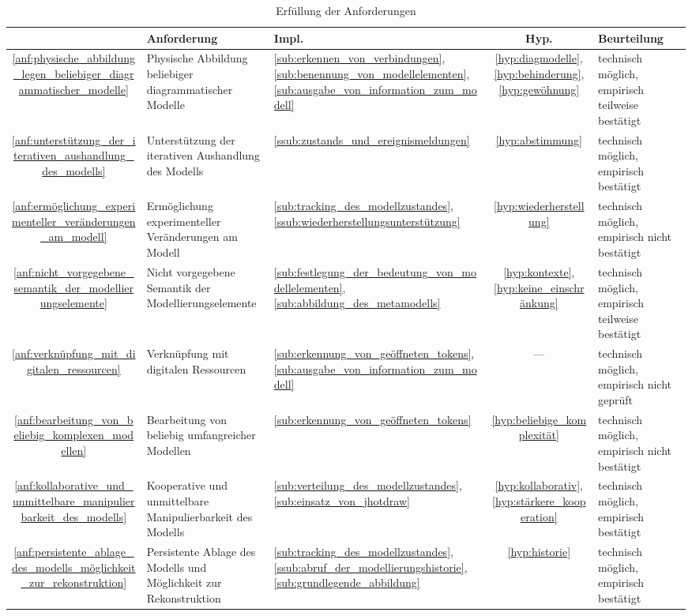 \begin{table}[htbp]
	\centering
	\caption{Erfüllung der Anforderungen}
\begin{tabular}{| c | p{5cm} | p{1cm} | c | p{4cm} |} 
  \hline
  & Anforderung & Impl. & Hyp. & Beurteilung \\ \hline \hline
  \ref{anf:physische_abbildung_legen_beliebiger_diagrammatischer_modelle} & Physische Abbildung beliebiger diagrammatischer Modelle &  \ref{sub:erkennen_von_verbindungen}, \ref{sub:benennung_von_modellelementen}, \ref{sub:ausgabe_von_information_zum_modell} & \ref{hyp:diagmodelle}, \ref{hyp:behinderung}, \ref{hyp:gewöhnung} & technisch möglich, empirisch teilweise bestätigt \\ \hline
  \ref{anf:unterstützung_der_iterativen_aushandlung_des_modells} & Unterstützung der iterativen Aushandlung des Modells & \ref{ssub:zustands_und_ereignismeldungen} & \ref{hyp:abstimmung} & technisch möglich, empirisch bestätigt \\ \hline
  \ref{anf:ermöglichung_experimenteller_veränderungen_am_modell} & Ermöglichung experimenteller Veränderungen am Modell & \ref{sub:tracking_des_modellzustandes}, \ref{ssub:wiederherstellungsunterstützung} & \ref{hyp:wiederherstellung} & technisch möglich, empirisch nicht bestätigt \\ \hline \hline
  \ref{anf:nicht_vorgegebene_semantik_der_modellierungselemente} & Nicht vorgegebene Semantik der Modellierungselemente & \ref{sub:festlegung_der_bedeutung_von_modellelementen}, \ref{sub:abbildung_des_metamodells} & \ref{hyp:kontexte}, \ref{hyp:keine_einschränkung} & technisch möglich, empirisch teilweise bestätigt \\ \hline
  \ref{anf:verknüpfung_mit_digitalen_ressourcen} & Verknüpfung mit digitalen Ressourcen & \ref{sub:erkennung_von_geöffneten_tokens}, \ref{sub:ausgabe_von_information_zum_modell} & --- & technisch möglich, empirisch nicht geprüft \\ \hline
  \ref{anf:bearbeitung_von_beliebig_komplexen_modellen} & Bearbeitung von beliebig umfangreicher Modellen & \ref{sub:erkennung_von_geöffneten_tokens} & \ref{hyp:beliebige_komplexität} & technisch möglich, empirisch nicht bestätigt \\ \hline \hline
  \ref{anf:kollaborative_und_unmittelbare_manipulierbarkeit_des_modells} & Kooperative und unmittelbare Manipulierbarkeit des Modells & \ref{sub:verteilung_des_modellzustandes}, \ref{sub:einsatz_von_jhotdraw} & \ref{hyp:kollaborativ}, \ref{hyp:stärkere_kooperation} & technisch möglich, empirisch bestätigt \\ \hline
  \ref{anf:persistente_ablage_des_modells_möglichkeit_zur_rekonstruktion} & Persistente Ablage des Modells und Möglichkeit zur Rekonstruktion & \ref{sub:tracking_des_modellzustandes}, \ref{ssub:abruf_der_modellierungshistorie}, \ref{sub:grundlegende_abbildung} & \ref{hyp:historie} & technisch möglich, empirisch bestätigt \\ \hline 
\end{tabular}
	\label{tab:erfuellung_der_anforderungen}
\end{table}


